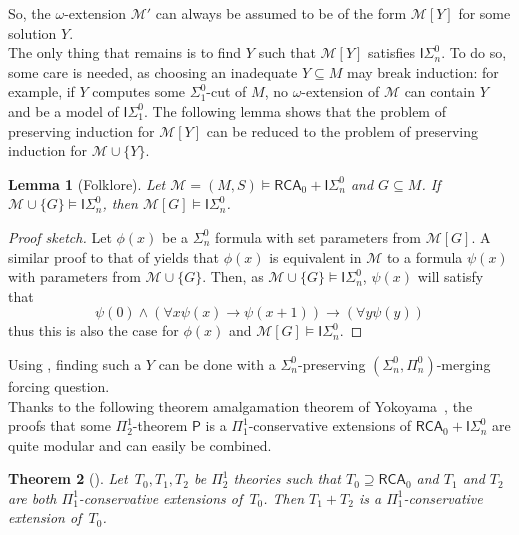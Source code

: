 \documentclass{article}
\def\M{\mathcal{M}}
\def\Psf{\mathsf{P}}
\newcommand{\ISig}{\mathsf{I}\Sigma^0}
\newcommand{\RCA}{\mathsf{RCA}}
\newtheorem{theorem}{Theorem}
\numberwithin{theorem}{section}
\newtheorem{lemma}[theorem]{Lemma}
\theoremstyle{definition}
\begin{document}
So, the $\omega$-extension $\M'$ can always be assumed to be of the form $\M[Y]$ for some solution $Y$. \\

The only thing that remains is to find $Y$ such that $\M[Y]$ satisfies $\ISig_n$. To do so, some care is needed, as choosing an inadequate $Y \subseteq M$ may break induction: for example, if $Y$ computes some $\Sigma_1^0$-cut of $M$, no $\omega$-extension of $\M$ can contain $Y$ and be a model of $\ISig_1$. The following lemma shows that the problem of preserving induction for $\M[Y]$ can be reduced to the problem of preserving induction for $\M \cup \{Y\}$.

\begin{lemma}[Folklore]\label{lem:induction-to-generated}
    Let $\M = (M,S) \models \RCA_0 + \ISig_n$ and $G \subseteq M$. If $\M \cup \{G\} \models \ISig_n$, then $\M[G] \models \ISig_n$.
\end{lemma}

\begin{proof}[Proof sketch]
Let $\phi(x)$ be a $\Sigma_n^0$ formula with set parameters from $\M[G]$. A similar proof to that of  yields that $\phi(x)$ is equivalent in $\M$ to a formula $\psi(x)$ with parameters from $\M \cup \{G\}$.
Then, as $\M \cup \{G\} \models \ISig_n$, $\psi(x)$ will satisfy that 
$$\psi(0) \wedge (\forall x \psi(x) \to \psi(x+1)) \to (\forall y \psi(y))$$
thus this is also the case for $\phi(x)$ and $\M[G] \models \ISig_n$.
\end{proof}

Using , finding such a $Y$ can be done with a $\Sigma^0_n$-preserving $(\Sigma^0_n,\Pi^0_n)$-merging forcing question. \\


Thanks to the following theorem amalgamation theorem of Yokoyama~\cite{yokoyama2009conservativity}, the proofs that some $\Pi_2^1$-theorem $\Psf$ is a $\Pi^1_1$-conservative extensions of $\RCA_0 + \ISig_n$ are quite modular and can easily be combined.


\begin{theorem}[\cite{yokoyama2010conservativity}]\label{thm:amalgamation-pi11}
Let~$T_0, T_1, T_2$ be $\Pi^1_2$ theories such that $T_0 \supseteq \RCA_0$ and $T_1$ and $T_2$ are both $\Pi^1_1$-conservative extensions of~$T_0$. Then $T_1 + T_2$ is a $\Pi^1_1$-conservative extension of~$T_0$.
\end{theorem}
\end{document}
